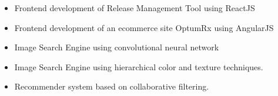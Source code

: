 \documentclass[10pt,a4paper,ragged2e]{altacv}
\begin{document}
\divider


\begin{itemize}
\item  Frontend development of Release Management Tool using ReactJS

\end{itemize}

\divider


\begin{itemize}
\item  Frontend development of an ecommerce site OptumRx using AngularJS

\end{itemize}
\divider


\begin{itemize}
\item  Image Search Engine using convolutional neural network

\end{itemize}

\divider


\begin{itemize}
\item  Image Search Engine using hierarchical color and texture techniques.

\end{itemize}

\divider


\begin{itemize}
\item  Recommender system based on collaborative filtering.

\end{itemize}
\end{document}
